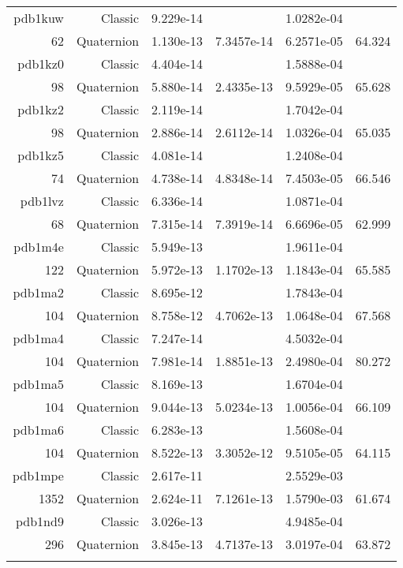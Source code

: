 \begin{xltabular}{\textwidth}{r|rS[table-format=1.3e+2]S[table-format=1.4e+2]S[table-format=1.4e+2]S[table-format=-1.3]}
pdb1kuw & Classic & 9.229e-14 &  & 1.0282e-04 & \\
62 & Quaternion & 1.130e-13 & 7.3457e-14 & 6.2571e-05 & 64.324\\  \addlinespace
pdb1kz0 & Classic & 4.404e-14 &  & 1.5888e-04 & \\
98 & Quaternion & 5.880e-14 & 2.4335e-13 & 9.5929e-05 & 65.628\\  \addlinespace
pdb1kz2 & Classic & 2.119e-14 &  & 1.7042e-04 & \\
98 & Quaternion & 2.886e-14 & 2.6112e-14 & 1.0326e-04 & 65.035\\  \addlinespace
pdb1kz5 & Classic & 4.081e-14 &  & 1.2408e-04 & \\
74 & Quaternion & 4.738e-14 & 4.8348e-14 & 7.4503e-05 & 66.546\\  \addlinespace
pdb1lvz & Classic & 6.336e-14 &  & 1.0871e-04 & \\
68 & Quaternion & 7.315e-14 & 7.3919e-14 & 6.6696e-05 & 62.999\\  \addlinespace
pdb1m4e & Classic & 5.949e-13 &  & 1.9611e-04 & \\
122 & Quaternion & 5.972e-13 & 1.1702e-13 & 1.1843e-04 & 65.585\\  \addlinespace
pdb1ma2 & Classic & 8.695e-12 &  & 1.7843e-04 & \\
104 & Quaternion & 8.758e-12 & 4.7062e-13 & 1.0648e-04 & 67.568\\  \addlinespace
pdb1ma4 & Classic & 7.247e-14 &  & 4.5032e-04 & \\
104 & Quaternion & 7.981e-14 & 1.8851e-13 & 2.4980e-04 & 80.272\\  \addlinespace
pdb1ma5 & Classic & 8.169e-13 &  & 1.6704e-04 & \\
104 & Quaternion & 9.044e-13 & 5.0234e-13 & 1.0056e-04 & 66.109\\  \addlinespace
pdb1ma6 & Classic & 6.283e-13 &  & 1.5608e-04 & \\
104 & Quaternion & 8.522e-13 & 3.3052e-12 & 9.5105e-05 & 64.115\\  \addlinespace
pdb1mpe & Classic & 2.617e-11 &  & 2.5529e-03 & \\
1352 & Quaternion & 2.624e-11 & 7.1261e-13 & 1.5790e-03 & 61.674\\  \addlinespace
pdb1nd9 & Classic & 3.026e-13 &  & 4.9485e-04 & \\
296 & Quaternion & 3.845e-13 & 4.7137e-13 & 3.0197e-04 & 63.872\\  \addlinespace

\end{xltabular}
